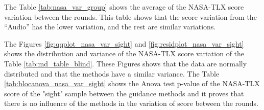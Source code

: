 %
%

The Table \ref{tab:nasa_var_group} shows the average of the NASA-TLX score variation between the rounds. This table shows that the score variation from the “Audio” has the lower variation, and the rest are similar variations.



The Figures \ref{fig:qqplot_nasa_var_sight} and \ref{fig:residplot_nasa_var_sight} shows the distribution and variance of the NASA-TLX score variation of the Table \ref{tab:md_table_blind}. These Figures shows that the data are normally distributed and that the methods have a similar variance.
The Table \ref{tab:blocanova_nasa_var_sight} shows the Anova test p-value of the NASA-TLX score of the "sight" sample between the guidance methods and it proves that there is no influence of the methods in the variation of score between the rounds. 



